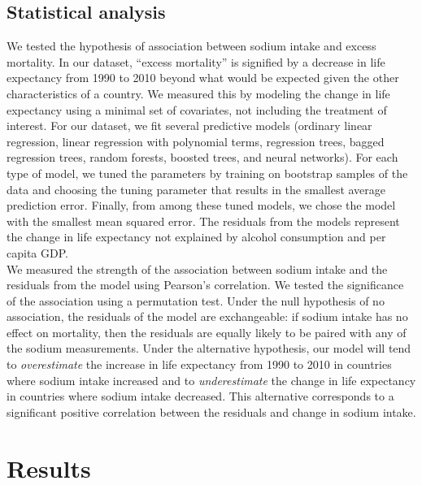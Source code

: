 \documentclass{article}
\begin{document}
\subsection{Statistical analysis}
We tested the hypothesis of association between sodium intake and excess mortality.  In our dataset, ``excess mortality'' is signified by a decrease in life expectancy from 1990 to 2010 beyond what would be expected given the other characteristics of a country.  We measured this by modeling the change in life expectancy using a minimal set of covariates, not including the treatment of interest.  For our dataset, we fit several predictive models (ordinary linear regression, linear regression with polynomial terms, regression trees, bagged regression trees, random forests, boosted trees, and neural networks).  For each type of model, we tuned the parameters by training on bootstrap samples of the data and choosing the tuning parameter that results in the smallest average prediction error.  Finally, from among these tuned models, we chose the model with the smallest mean squared error.  The residuals from the models represent the change in life expectancy not explained by alcohol consumption and per capita GDP. \\

We measured the strength of the association between sodium intake and the residuals from the model using Pearson's correlation. We tested the significance of the association using a permutation test.  Under the null hypothesis of no association, the residuals of the model are exchangeable: if sodium intake has no effect on mortality, then the residuals are equally likely to be paired with any of the sodium measurements.  Under the alternative hypothesis, our model will tend to \textit{overestimate} the increase in life expectancy from 1990 to 2010 in countries where sodium intake increased and to \textit{underestimate} the change in life expectancy in countries where sodium intake decreased. This alternative corresponds to a significant positive correlation between the residuals and change in sodium intake.  


\section{Results}
\end{document}
